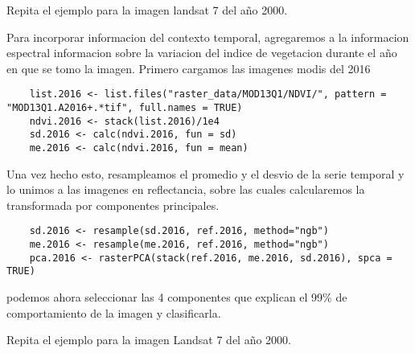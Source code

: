 \begin{act}
  Repita el ejemplo para la imagen landsat 7 del año 2000.
\end{act}

\begin{exa}
  Para incorporar informacion del contexto temporal, agregaremos a la informacion
  espectral informacion sobre la variacion del indice de vegetacion durante el
  año en que se tomo la imagen. Primero cargamos las imagenes modis del 2016

  \begin{lstlisting}
    list.2016 <- list.files("raster_data/MOD13Q1/NDVI/", pattern = "MOD13Q1.A2016+.*tif", full.names = TRUE)
    ndvi.2016 <- stack(list.2016)/1e4
    sd.2016 <- calc(ndvi.2016, fun = sd)
    me.2016 <- calc(ndvi.2016, fun = mean)
  \end{lstlisting}

  Una vez hecho esto, resampleamos el promedio y el desvio de la serie temporal
  y lo unimos a las imagenes en reflectancia, sobre las cuales calcularemos
  la transformada por componentes principales.

  \begin{lstlisting}
    sd.2016 <- resample(sd.2016, ref.2016, method="ngb")
    me.2016 <- resample(me.2016, ref.2016, method="ngb")
    pca.2016 <- rasterPCA(stack(ref.2016, me.2016, sd.2016), spca = TRUE)
  \end{lstlisting}

  podemos ahora seleccionar las 4 componentes que explican el 99\% de comportamiento
  de la imagen y clasificarla.
\end{exa}

\begin{act}
  Repita el ejemplo para la imagen Landsat 7 del año 2000.
\end{act}
